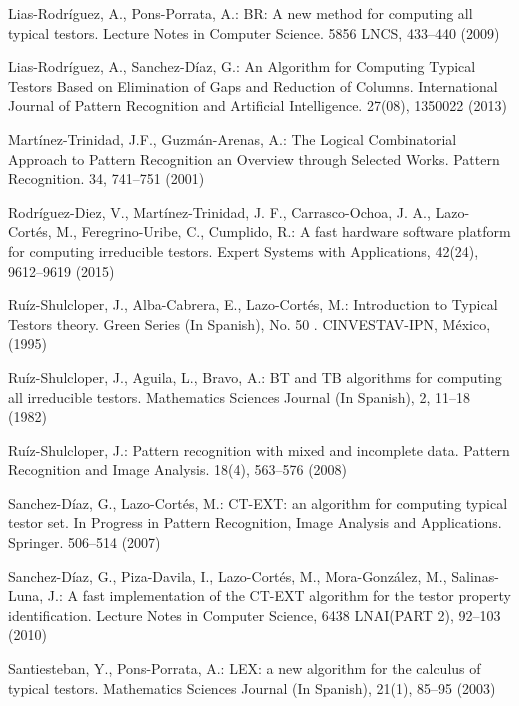 \documentclass[citenumber]{llncs}
\begin{document}
\begin{thebibliography}{}
	Lias-Rodr\'iguez, A., Pons-Porrata, A.:
	BR: A new method for computing all typical testors. 
	Lecture Notes in Computer Science.
	5856 LNCS, 433--440 (2009)

	Lias-Rodr\'iguez, A., Sanchez-D\'iaz, G.:
 	An Algorithm for Computing Typical Testors Based on Elimination of Gaps and Reduction of Columns.
 	International Journal of Pattern Recognition and Artificial Intelligence. 27(08), 1350022 (2013)

	Mart\'inez-Trinidad, J.F., Guzm\'an-Arenas, A.: 
	The Logical Combinatorial Approach to Pattern Recognition an Overview through Selected Works. 
	Pattern Recognition. 34, 741--751 (2001)

	Rodríguez-Diez, V., Martínez-Trinidad, J. F., Carrasco-Ochoa, J. A., Lazo-Cortés, M., Feregrino-Uribe, C., Cumplido, R.:
	A fast hardware software platform for computing irreducible testors. 
	Expert Systems with Applications, 
	42(24), 9612–9619 (2015)

	Ruíz-Shulcloper, J., Alba-Cabrera, E., Lazo-Cort\'es, M.:
	Introduction to Typical Testors theory.
	Green Series (In Spanish), No. 50 . CINVESTAV-IPN, México, (1995)
	
	Ruíz-Shulcloper, J., Aguila, L., Bravo, A.:
	BT and TB algorithms for computing all irreducible testors. 
	Mathematics Sciences Journal (In Spanish), 2, 11--18 (1982)

	Ruíz-Shulcloper, J.:
	Pattern recognition with mixed and incomplete data. 
	Pattern Recognition and Image Analysis. 18(4), 563--576 (2008)
	
	Sanchez-D\'iaz, G., Lazo-Cort\'es, M.:
	CT-EXT: an algorithm for computing typical testor set. 
	In Progress in Pattern Recognition, Image Analysis and Applications. 
	Springer. 506--514 (2007)

	Sanchez-D\'iaz, G., Piza-Davila, I., Lazo-Cort\'es, M., Mora-Gonz\'alez, M., Salinas-Luna, J.:
	A fast implementation of the CT-EXT algorithm for the testor property identification. 
	Lecture Notes in Computer Science, 6438 LNAI(PART 2), 92--103 (2010)

	Santiesteban, Y., Pons-Porrata, A.:
	LEX: a new algorithm for the calculus of typical testors. 
	Mathematics Sciences Journal (In Spanish), 21(1), 85--95 (2003)
	
	
\end{thebibliography}

%
\end{document}
